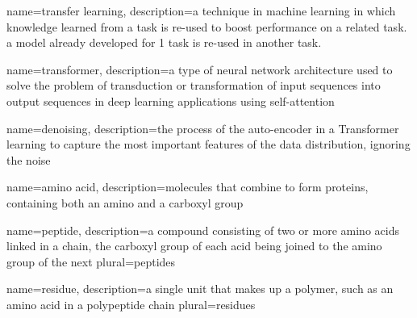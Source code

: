 
{
name=transfer learning,
description={a technique in machine learning in which knowledge learned from a task is re-used to boost performance on a related task. a model already developed for 1 task is re-used in another task.}
}

{
name=transformer,
description={a type of neural network architecture used to solve the problem of transduction or transformation of input sequences into output sequences in deep learning applications using self-attention}
}

{
name=denoising,
description={the process of the auto-encoder in a Transformer learning to capture the most important features of the data distribution, ignoring the noise}
}

{
name=amino acid,
description={molecules that combine to form proteins, containing both an amino and a carboxyl group}
}

{
name=peptide,
description={a compound consisting of two or more amino acids linked in a chain, the carboxyl group of each acid being joined to the amino group of the next}
plural={peptides}
}

{
name=residue,
description={a single unit that makes up a polymer, such as an amino acid in a polypeptide chain}
plural={residues}
}




